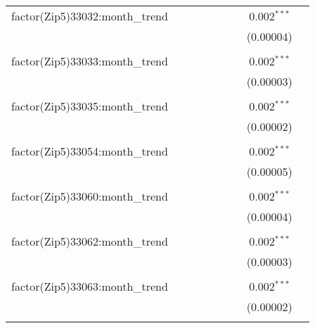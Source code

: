 \begin{table}[H]
{\begin{tabular}{@{\extracolsep{5pt}}lcccccccc}
  factor(Zip5)33032:month\_trend &  &  &  &  &  &  & 0.002$^{***}$ &  \\  

   &  &  &  &  &  &  & (0.00004) &  \\  

   & & & & & & & & \\  

  factor(Zip5)33033:month\_trend &  &  &  &  &  &  & 0.002$^{***}$ &  \\  

   &  &  &  &  &  &  & (0.00003) &  \\  

   & & & & & & & & \\  

  factor(Zip5)33035:month\_trend &  &  &  &  &  &  & 0.002$^{***}$ &  \\  

   &  &  &  &  &  &  & (0.00002) &  \\  

   & & & & & & & & \\  

  factor(Zip5)33054:month\_trend &  &  &  &  &  &  & 0.002$^{***}$ &  \\  

   &  &  &  &  &  &  & (0.00005) &  \\  

   & & & & & & & & \\  

  factor(Zip5)33060:month\_trend &  &  &  &  &  &  & 0.002$^{***}$ &  \\  

   &  &  &  &  &  &  & (0.00004) &  \\  

   & & & & & & & & \\  

  factor(Zip5)33062:month\_trend &  &  &  &  &  &  & 0.002$^{***}$ &  \\  

   &  &  &  &  &  &  & (0.00003) &  \\  

   & & & & & & & & \\  

  factor(Zip5)33063:month\_trend &  &  &  &  &  &  & 0.002$^{***}$ &  \\  

   &  &  &  &  &  &  & (0.00002) &  \\  

   & & & & & & & & \\  


\end{tabular}}
\end{table}
